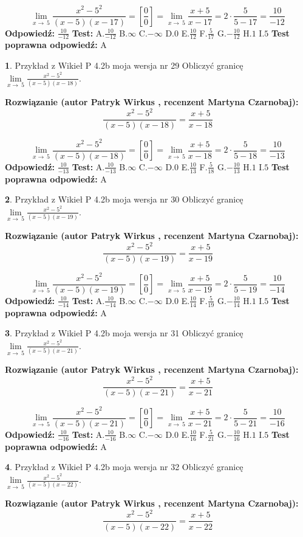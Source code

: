 \documentclass[12pt, a4paper]{article}
\theoremstyle{definition} %
\newtheorem{zad}{}
\newcommand{\zadStart}[1]{\begin{zad}#1\newline}
\newcommand{\zadStop}{\end{zad}}
\newcommand{\rozwStart}[2]{\noindent \textbf{Rozwiązanie (autor #1 , recenzent #2): }\newline}
\newcommand{\rozwStop}{\newline}
\newcommand{\odpStart}{\noindent \textbf{Odpowiedź:}\newline}
\newcommand{\odpStop}{\newline}
\newcommand{\testStart}{\noindent \textbf{Test:}\newline}
\newcommand{\testStop}{\newline}
\newcommand{\kluczStart}{\noindent \textbf{Test poprawna odpowiedź:}\newline}
\newcommand{\kluczStop}{\newline}
\begin{document}
$$\lim\limits_{x\to\ 5}\frac{x^{2}-5^{2}}{(x-5)(x-17)}=[\frac{0}{0}]=\lim\limits_{x\to\ 5}\frac{x+5}{x-17}=2 \cdot \frac{5}{5-17} = \frac{10}{-12}$$
\rozwStop
\odpStart
$\frac{10}{-12}$
\odpStop
\testStart
A.$\frac{10}{-12}$
B.$\infty$
C.$-\infty$
D.$0$
E.$\frac{10}{12}$
F.$\frac{5}{17}$
G.$-\frac{10}{12}$
H.$1$
I.$5$
\testStop
\kluczStart
A
\kluczStop



\zadStart{Przykład z Wikieł P 4.2b moja wersja nr 29}
Obliczyć granicę $\lim\limits_{x\to\ 5}\frac{x^{2}-5^{2}}{(x-5)(x-18)}$.
\zadStop
\rozwStart{Patryk Wirkus}{Martyna Czarnobaj}
$$\frac{x^{2}-5^{2}}{(x-5)(x-18)}=\frac{x+5}{x-18}$$

$$\lim\limits_{x\to\ 5}\frac{x^{2}-5^{2}}{(x-5)(x-18)}=[\frac{0}{0}]=\lim\limits_{x\to\ 5}\frac{x+5}{x-18}=2 \cdot \frac{5}{5-18} = \frac{10}{-13}$$
\rozwStop
\odpStart
$\frac{10}{-13}$
\odpStop
\testStart
A.$\frac{10}{-13}$
B.$\infty$
C.$-\infty$
D.$0$
E.$\frac{10}{13}$
F.$\frac{5}{18}$
G.$-\frac{10}{13}$
H.$1$
I.$5$
\testStop
\kluczStart
A
\kluczStop



\zadStart{Przykład z Wikieł P 4.2b moja wersja nr 30}
Obliczyć granicę $\lim\limits_{x\to\ 5}\frac{x^{2}-5^{2}}{(x-5)(x-19)}$.
\zadStop
\rozwStart{Patryk Wirkus}{Martyna Czarnobaj}
$$\frac{x^{2}-5^{2}}{(x-5)(x-19)}=\frac{x+5}{x-19}$$

$$\lim\limits_{x\to\ 5}\frac{x^{2}-5^{2}}{(x-5)(x-19)}=[\frac{0}{0}]=\lim\limits_{x\to\ 5}\frac{x+5}{x-19}=2 \cdot \frac{5}{5-19} = \frac{10}{-14}$$
\rozwStop
\odpStart
$\frac{10}{-14}$
\odpStop
\testStart
A.$\frac{10}{-14}$
B.$\infty$
C.$-\infty$
D.$0$
E.$\frac{10}{14}$
F.$\frac{5}{19}$
G.$-\frac{10}{14}$
H.$1$
I.$5$
\testStop
\kluczStart
A
\kluczStop



\zadStart{Przykład z Wikieł P 4.2b moja wersja nr 31}
Obliczyć granicę $\lim\limits_{x\to\ 5}\frac{x^{2}-5^{2}}{(x-5)(x-21)}$.
\zadStop
\rozwStart{Patryk Wirkus}{Martyna Czarnobaj}
$$\frac{x^{2}-5^{2}}{(x-5)(x-21)}=\frac{x+5}{x-21}$$

$$\lim\limits_{x\to\ 5}\frac{x^{2}-5^{2}}{(x-5)(x-21)}=[\frac{0}{0}]=\lim\limits_{x\to\ 5}\frac{x+5}{x-21}=2 \cdot \frac{5}{5-21} = \frac{10}{-16}$$
\rozwStop
\odpStart
$\frac{10}{-16}$
\odpStop
\testStart
A.$\frac{10}{-16}$
B.$\infty$
C.$-\infty$
D.$0$
E.$\frac{10}{16}$
F.$\frac{5}{21}$
G.$-\frac{10}{16}$
H.$1$
I.$5$
\testStop
\kluczStart
A
\kluczStop



\zadStart{Przykład z Wikieł P 4.2b moja wersja nr 32}
Obliczyć granicę $\lim\limits_{x\to\ 5}\frac{x^{2}-5^{2}}{(x-5)(x-22)}$.
\zadStop
\rozwStart{Patryk Wirkus}{Martyna Czarnobaj}
$$\frac{x^{2}-5^{2}}{(x-5)(x-22)}=\frac{x+5}{x-22}$$
\end{document}
